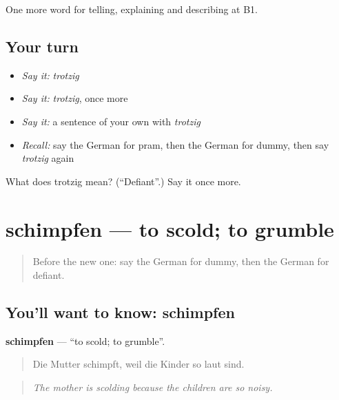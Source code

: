 \begin{grammarlens}[title={What you've built}]
One more word for telling, explaining and describing at B1.
\end{grammarlens}

\subsection*{Your turn}
\begin{itemize}
\raggedright
  \item \emph{Say it:} \emph{trotzig}
  \item \emph{Say it:} \emph{trotzig}, once more
  \item \emph{Say it:} a sentence of your own with \emph{trotzig}
  \item \emph{Recall:} say the German for pram, then the German for dummy, then say \emph{trotzig} again
\end{itemize}

\begin{tcolorbox}[breakable,colback=teal!4,colframe=teal!35!black,title={Before you move on}]
What does trotzig mean? (\textquotedblleft{}Defiant\textquotedblright{}.) Say it once more.
\end{tcolorbox}
\section[schimpfen]{schimpfen — to scold; to grumble}

\label{lesson:GE-C497-schimpfen}



\begin{quote}
Before the new one: say the German for dummy, then the German for defiant.
\end{quote}

\subsection*{You'll want to know: schimpfen}
\textbf{schimpfen} — \textquotedblleft{}to scold; to grumble\textquotedblright{}.

\begin{quote}
Die Mutter schimpft, weil die Kinder so laut sind.
\end{quote}

\begin{quote}
\emph{The mother is scolding because the children are so noisy.}
\end{quote}

